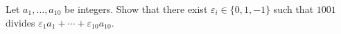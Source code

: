 Let $a_1, \ldots, a_{10}$ be integers. Show that there exist $\varepsilon_i \in \{0, 1, -1\}$ such that $1001$ divides $\varepsilon_1 a_1 + \cdots + \varepsilon_{10} a_{10}$.
